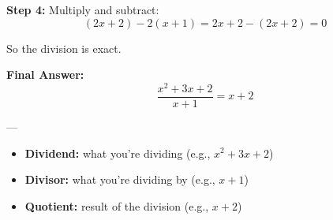 \documentclass[11pt]{article}
\begin{document}
\textbf{Step 4:} Multiply and subtract:
\[
(2x + 2) - 2(x + 1) = 2x + 2 - (2x + 2) = 0
\]

So the division is exact.

\textbf{Final Answer:}
\[
\frac{x^2 + 3x + 2}{x + 1} = x + 2
\]

---

\begin{tcolorbox}[title=Terminology Review, colback=blue!5!white, colframe=blue!75!black]
\begin{itemize}
  \item \textbf{Dividend:} what you're dividing \quad (e.g., \( x^2 + 3x + 2 \))
  \item \textbf{Divisor:} what you're dividing by \quad (e.g., \( x + 1 \))
  \item \textbf{Quotient:} result of the division \quad (e.g., \( x + 2 \))
\end{itemize}
\end{tcolorbox}
\end{document}
